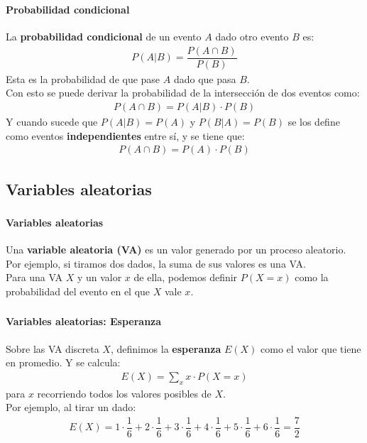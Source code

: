 \documentclass[../main.tex]{subfiles}
\begin{document}
\begin{frame}
  \frametitle{\SECTIONA}
  \framesubtitle{Probabilidad condicional}

  La \textbf{probabilidad condicional} de un evento \(A\) dado otro evento \(B\) es:
  \begin{gather*}
    P(A | B) = \dfrac{P(A \cap B)}{P(B)}
  \end{gather*}
  Esta es la probabilidad de que pase \(A\) dado que pasa \(B\). \pause \\
  Con esto se puede derivar la probabilidad de la intersección de dos eventos como:
  \begin{gather*}
    P(A \cap B) = P(A | B) \cdot P(B)
  \end{gather*} \pause
  Y cuando sucede que \(P(A|B) = P(A)\) y \(P(B|A) = P(B)\) se los define como eventos \textbf{independientes} entre sí, y se tiene que:
  \begin{gather*}
    P(A \cap B) = P(A) \cdot P(B)
  \end{gather*}
\end{frame}


\subsection{Variables aleatorias}

\begin{frame}
  \frametitle{\SECTIONA}
  \framesubtitle{Variables aleatorias}

  Una \textbf{variable aleatoria (VA)} es un valor generado por un proceso aleatorio. Por ejemplo, si tiramos dos dados, la suma de sus valores es una VA. \pause \\
  Para una VA \(X\) y un valor \(x\) de ella, podemos definir \(P(X = x)\) como la probabilidad del evento en el que \(X\) vale \(x\).
\end{frame}


\begin{frame}
  \frametitle{\SECTIONA}
  \framesubtitle{Variables aleatorias: Esperanza}

  Sobre las VA discreta \(X\), definimos la \textbf{esperanza} \(E(X)\) como el valor que tiene en promedio. Y se calcula:
  \begin{gather*}
    E(X) = \sum_{x}x \cdot P(X = x)
  \end{gather*}
  para \(x\) recorriendo todos los valores posibles de \(X\). \pause \\
  Por ejemplo, al tirar un dado:
  \begin{gather*}
    E(X) = 1 \cdot \dfrac{1}{6} + 2 \cdot \dfrac{1}{6} + 3 \cdot \dfrac{1}{6} + 4 \cdot \dfrac{1}{6} + 5 \cdot \dfrac{1}{6} + 6 \cdot \dfrac{1}{6} = \dfrac{7}{2}
  \end{gather*}
\end{frame}
\end{document}
